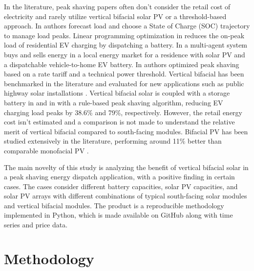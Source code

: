 \documentclass[conference]{IEEEtran}
\begin{document}


In the literature, peak shaving papers often don't consider the retail cost of electricity and rarely utilize vertical bifacial solar PV or a threshold-based approach. In \cite{Reihani2016} authors forecast load and choose a State of Charge (SOC) trajectory to manage load peaks. Linear programming optimization in \cite{Lee2014} reduces the on-peak load of residential EV charging by dispatching a battery. In \cite{Gazafroudi2018} a multi-agent system buys and sells energy in a local energy market for a residence with solar PV and a dispatchable vehicle-to-home EV battery. In \cite{Zheng2015} authors optimized peak shaving based on a rate tariff and a technical power threshold. Vertical bifacial has been benchmarked in the literature and evaluated for new applications such as public highway solar installations \cite{Niccolai2022}. Vertical bifacial solar is coupled with a storage battery in \cite{Wallberg2022} and in \cite{Castellucci2022} with a rule-based peak shaving algorithm, reducing EV charging load peaks by 38.6\% and 79\%, respectively. However, the retail energy cost isn't estimated and a comparison is not made to understand the relative merit of vertical bifacial compared to south-facing modules. Bifacial PV has been studied extensively in the literature, performing around 11\% better than comparable monofacial PV \cite{Ogliari2023}.


The main novelty of this study is analyzing the benefit of vertical bifacial solar in a peak shaving energy dispatch application, with a positive finding in certain cases. The cases consider different battery capacities, solar PV capacities, and solar PV arrays with different combinations of typical south-facing solar modules and vertical bifacial modules.  The product is a reproducible methodology implemented in Python, which is made available on GitHub along with time series and price data. 

\section{Methodology}
\end{document}
